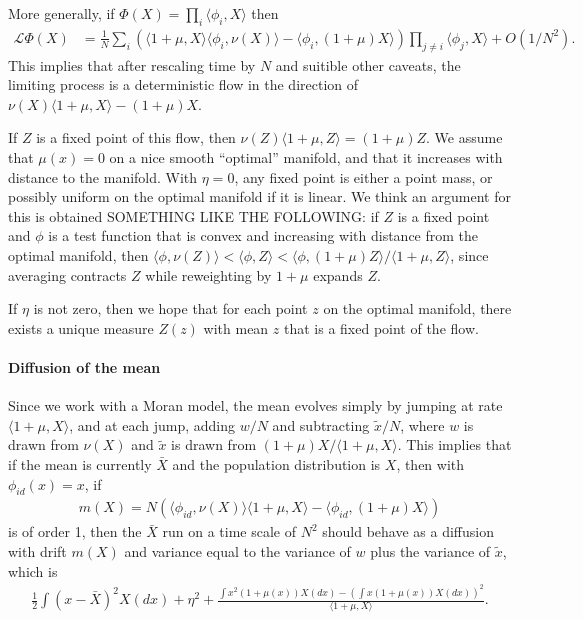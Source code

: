 \documentclass{article}
\newcommand{\mL}{\mathcal{L}}
\newcommand{\ip}[2]{\langle #1, #2 \rangle}
\begin{document}
More generally, if $\Phi(X) = \prod_i \ip{\phi_i}{X}$ then
\begin{align*}
    \mL \Phi(X)
    &=
    \frac{1}{N} \sum_i \left( 
        \ip{1+\mu}{X} \ip{\phi_i}{\nu(X)}  - \ip{\phi_i}{(1+\mu)X}
    \right)
    \prod_{j \neq i} \ip{\phi_j}{X} 
    + O(1/N^2) .
\end{align*}
This implies that after rescaling time by $N$
and suitible other caveats,
the limiting process is a deterministic flow in the direction of 
$\nu(X) \ip{1+\mu}{X} - (1+\mu)X$.

If $Z$ is a fixed point of this flow,
then $\nu(Z)\ip{1+\mu}{Z} = (1+\mu)Z$.
We assume that $\mu(x) = 0$ on a nice smooth ``optimal'' manifold,
and that it increases with distance to the manifold.
With $\eta = 0$,
any fixed point is either a point mass,
or possibly uniform on the optimal manifold if it is linear.
We think an argument for this is obtained SOMETHING LIKE THE FOLLOWING: 
if $Z$ is a fixed point
and $\phi$ is a test function that is convex and increasing with distance from the optimal manifold,
then $\ip{\phi}{\nu(Z)} < \ip{\phi}{Z} < \ip{\phi}{(1+\mu)Z}/\ip{1+\mu}{Z}$,
since averaging contracts $Z$ while reweighting by $1+\mu$ expands $Z$.

If $\eta$ is not zero, then we hope that for each point $z$ on the optimal manifold,
there exists a unique measure $Z(z)$ with mean $z$ that is a fixed point
of the flow.

\paragraph{Diffusion of the mean}
Since we work with a Moran model,
the mean evolves simply by jumping at rate $\ip{1+\mu}{X}$,
and at each jump, adding $w/N$ and subtracting $\tilde x/N$,
where $w$ is drawn from $\nu(X)$ and $\tilde x$ is drawn from 
$(1+\mu)X/\ip{1+\mu}{X}$.
This implies that if the mean is currently $\bar X$
and the population distribution is $X$,
then with $\phi_{id}(x) = x$,
if
\begin{align*}
    m(X) = N \left( \ip{\phi_{id}}{\nu(X)}\ip{1+\mu}{X}
    -
    \ip{\phi_{id}}{(1+\mu)X} \right)
\end{align*}
is of order 1,
then
the $\bar X$ run on a time scale of $N^2$
should behave as a diffusion with drift $m(X)$
and variance equal to the variance of $w$ plus the variance of $\tilde x$, which is
\begin{align*}
    \frac{1}{2} \int (x-\bar X)^2 X(dx) + \eta^2
    + \frac{ \int x^2 (1+\mu(x)) X(dx)  
    - \left(\int x (1+\mu(x)) X(dx)\right)^2 }{ \ip{1+\mu}{X} } .
\end{align*}
\end{document}
